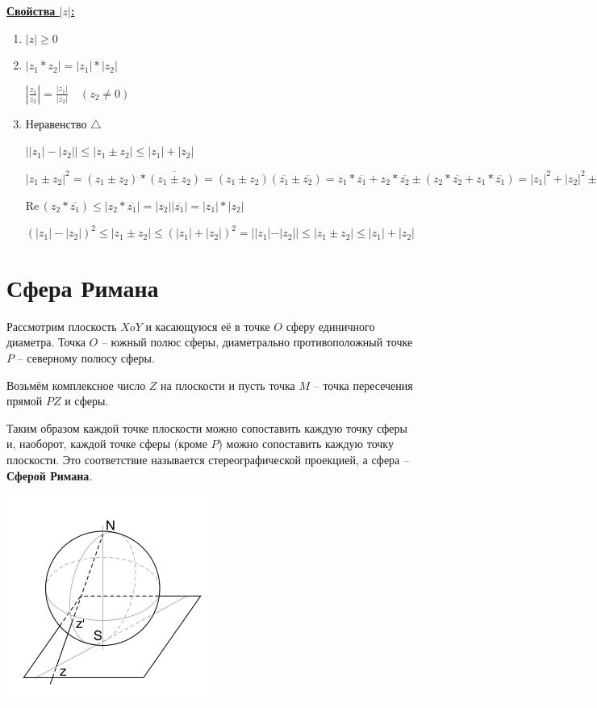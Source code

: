 \documentclass[a4paper,oneside]{article}
\newcommand{\real}{\mathrm{Re} \,}
\theoremstyle{definition}
\theoremstyle{definition}
\theoremstyle{definition}
\begin{document}
\underline{\textbf{Свойства $|z|$:}}

\begin{enumerate}
    \item $|z| \ge 0$
    \item $|z_1 * z_2| = |z_1| * |z_2|$
    
    $\left| \frac{z_1}{z_2} \right| = \frac{|z_1|}{|z_2|} \quad (z_2 \ne 0)$

    \item Неравенство $\triangle$
    
    $\left| |z_1| - |z_2| \right| \le |z_1 \pm z_2| \le |z_1| + |z_2|$
    
    $|z_1 \pm z_2|^2 = (z_1 \pm z_2) * \overline{(z_1 \pm z_2)} 
    = (z_1 \pm z_2) (\overline{z_1} \pm \overline{z_2})
    = z_1 * \overline{z_1} + z_2 * \overline{z_2} \pm (z_2 * \overline{z_2} + z_1 * \overline{z_1})
    = |z_1|^2+|z_2|^2 \pm 2 \real (z_2 * \overline{z_1})$

    $\real (z_2 * \overline{z_1}) \le |z_2 * \overline{z_1}| = |z_2| |\overline{z_1}| = |z_1| * |z_2|$

    $(|z_1|-|z_2|)^2 \le |z_1 \pm z_2| \le (|z_1| + |z_2|)^2
    = | |z_1| - |z_2| | \le |z_1 \pm z_2| \le |z_1| + |z_2|$
\end{enumerate}

\section{Сфера Римана}

Рассмотрим плоскость $XoY$ и касающуюся её в точке $O$ сферу
единичного диаметра. Точка $O$ -- южный полюс сферы, диаметрально
противоположный точке $P$ -- северному полюсу сферы. 

Возьмём комплексное число $Z$ на плоскости и пусть точка $M$ --
точка пересечения прямой $PZ$ и сферы.

Таким образом каждой точке плоскости можно сопоставить каждую точку 
сферы и, наоборот, каждой точке сферы (кроме $P$) можно сопоставить
каждую точку плоскости. Это соответствие называется стереографической
проекцией, а сфера -- \textbf{Сферой Римана}. 

\includegraphics[scale=0.5]{riemannsphere}
\end{document}

